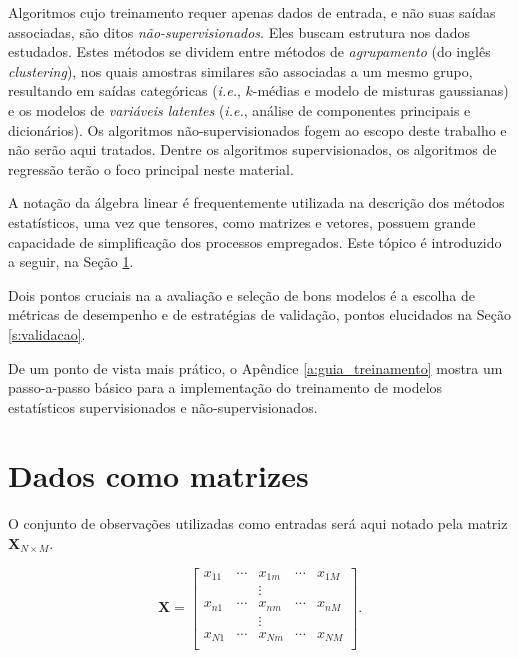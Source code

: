   Algoritmos cujo treinamento requer apenas dados de entrada, e não suas saídas associadas, são ditos \emph{não-supervisionados}. Eles buscam estrutura nos dados estudados. Estes métodos se dividem entre métodos de \emph{agrupamento} (do inglês \textit{clustering}), nos quais amostras similares são associadas a um mesmo grupo, resultando em saídas categóricas (\textit{i.e.}, $k$-médias e modelo de misturas gaussianas) e os modelos de \emph{variáveis latentes} (\textit{i.e.}, análise de componentes principais e dicionários). Os algoritmos não-supervisionados fogem ao escopo deste trabalho e não serão aqui tratados. Dentre os algoritmos supervisionados, os algoritmos de regressão terão o foco principal neste material.

  A notação da álgebra linear é frequentemente utilizada na descrição dos métodos estatísticos, uma vez que tensores, como matrizes e vetores, possuem grande capacidade de simplificação dos processos empregados. Este tópico é introduzido a seguir, na Seção \ref{s:notacao_algebrica}.

  Dois pontos cruciais na a avaliação e seleção de bons modelos é a escolha de métricas de desempenho e de estratégias de validação, pontos elucidados na Seção \ref{s:validacao}.

  De um ponto de vista mais prático, o Apêndice \ref{a:guia_treinamento} mostra um passo-a-passo básico para a implementação do treinamento de modelos estatísticos supervisionados e não-supervisionados.

  \section{Dados como matrizes}  \label{s:notacao_algebrica}

    O conjunto de observações utilizadas como entradas será aqui notado pela matriz $\boldsymbol{X}_{N \times M}$.

    \begin{equation} \label{e:X}
      \boldsymbol{X} = \begin{bmatrix}
        x_{11} & \cdots & x_{1m} & \cdots & x_{1M} \\
               & & \vdots & &       \\
        x_{n1} & \cdots & x_{nm} & \cdots & x_{nM} \\
               & & \vdots & &       \\
        x_{N1} & \cdots & x_{Nm} & \cdots & x_{NM} \\
      \end{bmatrix}
      .
    \end{equation}

